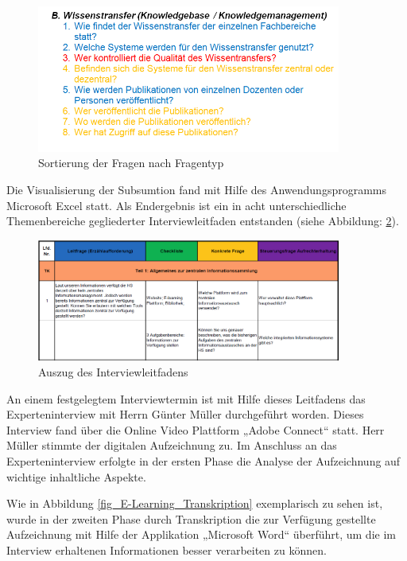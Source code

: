 \begin{figure}[h!]
	\centering
	\includegraphics[width=10cm]{kapitel/gruppe2/bilder/sortierung_fragentyp}
	\caption{Sortierung der Fragen nach Fragentyp}
	\label{fig_sortierung_fragentyp}
\end{figure}

Die Visualisierung der Subsumtion fand mit Hilfe des Anwendungsprogramms Microsoft Excel statt. Als Endergebnis ist ein in acht unterschiedliche Themenbereiche gegliederter Interviewleitfaden entstanden (siehe Abbildung: \ref{fig_auszug_interviewleitfaden}).

\begin{figure}[h!]
	\centering
	\includegraphics[width=10cm]{kapitel/gruppe2/bilder/auszug_leitfaden}
	\caption{Auszug des Interviewleitfadens}
	\label{fig_auszug_interviewleitfaden}
\end{figure}

An einem festgelegtem Interviewtermin ist mit Hilfe dieses Leitfadens das Experteninterview mit Herrn Günter Müller durchgeführt worden. Dieses Interview fand über die Online Video Plattform „Adobe Connect“ statt. Herr Müller stimmte der digitalen Aufzeichnung zu. Im Anschluss an das Experteninterview erfolgte in der ersten Phase die Analyse der Aufzeichnung auf wichtige inhaltliche Aspekte.

Wie in Abbildung \ref{fig_E-Learning_Transkription} exemplarisch zu sehen ist, wurde in der zweiten Phase durch Transkription die zur Verfügung gestellte Aufzeichnung mit Hilfe der Applikation „Microsoft Word“ überführt, um die im Interview erhaltenen Informationen besser verarbeiten zu können.


